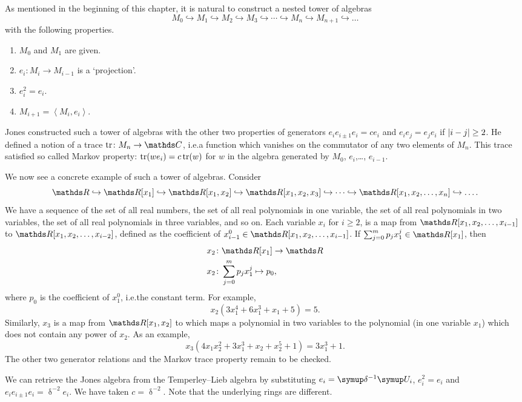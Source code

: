 As mentioned in the beginning of this chapter, it is natural to construct a nested tower of algebras \[M_0 \hookrightarrow M_1 \hookrightarrow M_2 \hookrightarrow M_3\hookrightarrow \cdots \hookrightarrow M_n \hookrightarrow M_{n+1} \hookrightarrow\ldots\] with the following properties.
\begin{enumerate}
    \item \(M_0\) and \(M_1\) are given.
	\item \(e_i\colon M_i \rightarrow M_{i-1}\) is a `projection'.
	\item \(e_i^2 = e_i\).
	\item \(M_{i+1} = \left\langle M_i,e_i\right\rangle\).
\end{enumerate}
Jones constructed such a tower of algebras with the other two properties of generators \(e_ie_{i\pm 1} e_i = ce_i\) and \(e_ie_j = e_je_i\) if \(\lvert i-j\rvert \geq 2\). He defined a notion of a trace \(\tr\colon M_n \rightarrow \C\), i.e.\@ a function which vanishes on the commutator of any two elements of \(M_n\). This trace satisfied so called Markov property: \(\operatorname{tr}(we_i) = c\operatorname{tr}(w)\) for \(w\) in the algebra generated by \(M_0\), \(e_i\),\ldots, \(e_{i-1}\).

We now see a concrete example of such a tower of algebras. Consider \[\R \hookrightarrow \R[x_1] \hookrightarrow \R[x_1, x_2] \hookrightarrow \R[x_1, x_2, x_3] \hookrightarrow \cdots \hookrightarrow \R[x_1, x_2, \ldots, x_n] \hookrightarrow \ldots.\] We have a sequence of the set of all real numbers, the set of all real polynomials in one variable, the set of all real polynomials in two variables, the set of all real polynomials in three variables, and so on. Each variable \(x_i\) for \(i\geq 2\), is a map from \(\R[x_1, x_2, \ldots, x_{i-1}]\) to \(\R[x_1, x_2, \ldots, x_{i-2}]\), defined as the coefficient of \(x_{i-1}^0 \in \R[x_1, x_2, \ldots, x_{i-1}]\). If \(\sum_{j=0}^{m}p_j x^{j}_1 \in \R[x_1]\), then
\begin{align*}
    x_2 &\colon \R[x_1] \rightarrow \R\\
	x_2 &\colon \sum_{j=0}^{m}p_j x^{j}_1 \mapsto p_0,
\end{align*}
where \(p_0\) is the coefficient of \(x_1^0\), i.e.\@ the constant term. For example, \[x_2 (3x_1^4 + 6x_1^3 + x_1 + 5) = 5.\] Similarly, \(x_3\) is a map from \(\R[x_1, x_2]\) to which maps a polynomial in two variables to the polynomial (in one variable \(x_1\)) which does not contain any power of \(x_2\). As an example, \[x_3(4x_1x_2^2 + 3x_1^3 + x_2 + x_2^5 + 1) = 3x_1^3 + 1.\] The other two generator relations and the Markov trace property remain to be checked.

We can retrieve the Jones algebra from the Temperley--Lieb algebra by substituting \(e_i = \updelta^{-1} \U_i\), \(e_i^2 = e_i\) and \(e_ie_{i\pm 1} e_i = \updelta^{-2}e_i\). We have taken \(c = \updelta^{-2}\). Note that the underlying rings are different.








